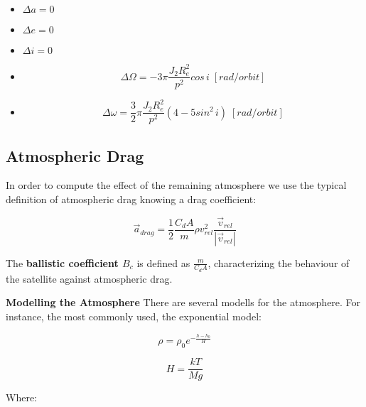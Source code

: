 \begin{itemize}
\item $\Delta a = 0$
\item $\Delta e = 0$
\item $\Delta i = 0$
\item 
\begin{equation}\Delta\Omega = -3\pi \frac{J_{2}R_{e}^2}{p^2}cos\,i\; [rad/orbit]
\end{equation}
\item 
\begin{equation}\Delta\omega = \frac{3}{2} \pi \frac{J_{2}R_{e}^2}{p^2}(4-5sin^2\,i)\; [rad/orbit]
\end{equation}

\end{itemize}

\subsection{Atmospheric Drag}
In order to compute the effect of the remaining atmosphere we use the typical definition of atmospheric drag knowing a drag coefficient:

\begin{equation}
\vec{a}_{drag}= \frac{1}{2}\frac{C_{d}A}{m}\rho v_{rel}^2 \frac{\vec{v}_{rel}}{|\vec{v}_{rel}|}
\label{eq:drag}
\end{equation}

The \textbf{ballistic coefficient $B_{c}$} is defined as $\frac{m}{C_{d}A}$, characterizing the behaviour of the satellite against atmospheric drag.\newline

\textbf{Modelling the Atmosphere}\newline
There are several modells for the atmosphere. For instance, the most commonly used, the exponential model:

\begin{equation}
\rho = \rho_{0} e^{-\frac{h-h_{0}}{H}}
\end{equation}

\begin{equation}
H = \frac{kT}{Mg}
\end{equation}

Where:

